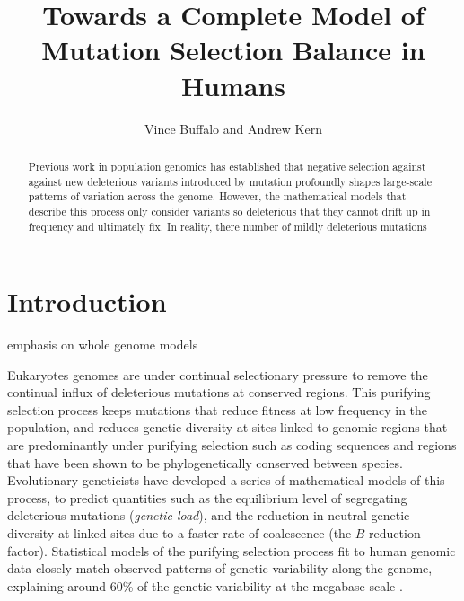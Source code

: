 \documentclass[11pt]{article}
\title{Towards a Complete Model of Mutation Selection Balance in Humans}
\author{Vince Buffalo and Andrew Kern}
\begin{document}
\maketitle



\begin{abstract} 

Previous work in population genomics has established that negative selection
against against new deleterious variants introduced by mutation profoundly
shapes large-scale patterns of variation across the genome. However, the
mathematical models that describe this process only consider variants so
deleterious that they cannot drift up in frequency and ultimately fix. In
reality, there number of mildly deleterious mutations 


\end{abstract}



\section*{Introduction}


emphasis on whole genome models

Eukaryotes genomes are under continual selectionary pressure to remove the
continual influx of deleterious mutations at conserved regions. This purifying
selection process keeps mutations that reduce fitness at low frequency in the
population, and reduces genetic diversity at sites linked to genomic regions
that are predominantly under purifying selection such as coding sequences and
regions that have been shown to be phylogenetically conserved between species.
Evolutionary geneticists have developed a series of mathematical models of this
process, to predict quantities such as the equilibrium level of segregating
deleterious mutations (\emph{genetic load}), and the reduction in neutral
genetic diversity at linked sites due to a faster rate of coalescence (the $B$
reduction factor). Statistical models of the purifying selection process fit to
human genomic data closely match observed patterns of genetic variability along
the genome, explaining around 60\% of the genetic variability at the megabase
scale \parencite{McVicker2009-ax,Murphy2022-sj}.
\end{document}

